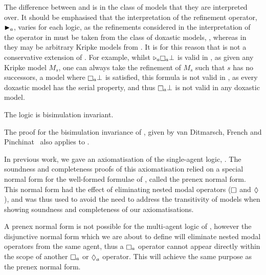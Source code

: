 The difference between \logicKF{} and \logicKDF{} is in the class of models that
they are interpreted over. It should be emphasised that the interpretation of
the refinement operator, ${\mathopen{\blacktriangleright}}_a$, varies for each logic, as the refinements
considered in the interpretation of the operator in \logicKDF{} must be taken
from the class of doxastic models, \classKD{}, whereas in \logicKF{} they may be
arbitrary Kripke models from \classK{}. It is for this reason that \logicKDF{}
is not a conservative extension of \logicKF{}. For example, whilst $\somerefs_a
\knows_a \bot$ is valid in \logicKF{}, as given any Kripke model $M_s$, one can
always take the refinement of $M_s$ such that $s$ has no successors, a model
where $\knows_a \bot$ is satisfied, this formula is not valid in \logicKDF{}, as
every doxastic model has the serial property, and thus $\knows_a \bot$ is not
valid in any doxastic model.

\begin{lemma}
The logic \logicKDF{} is bisimulation invariant.
\end{lemma}

The proof for the bisimulation invariance of \logicKF{}, given by van Ditmarsch,
French and Pinchinat~\cite{french2010future} also applies to \logicKDF{}.


In previous work, we gave an axiomatisation of the single-agent logic,
\logicKDiF{}. The soundness and completeness proofs of this axiomatisation
relied on a special normal form for the well-formed formulae of \logicKDi{},
called the prenex normal form. This normal form had the effect of eliminating
nested modal operators ($\knows$ and $\suspects$), and was thus used to avoid the
need to address the transitivity of \classKD{} models when showing soundness and
completeness of our axiomatisations. 

A prenex normal form is not possible for the multi-agent logic of \logicKD{},
however the disjunctive normal form which we are about to define will eliminate
nested modal operators from the same agent, thus a $\knows_a$ operator cannot
appear directly within the scope of another $\knows_a$ or $\suspects_a$
operator. This will achieve the same purpose as the prenex normal form.

